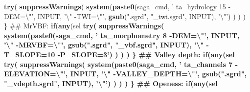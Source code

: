 \documentclass[11pt]{krantz}
\newenvironment{Shaded}{\begin{snugshade}}{\end{snugshade}}
\newcommand{\CharTok}[1]{\textcolor[rgb]{0.5,0.5,0.5}{#1}}
\newcommand{\ControlFlowTok}[1]{\textcolor[rgb]{0.27,0.27,0.27}{\textbf{#1}}}
\newcommand{\KeywordTok}[1]{\textcolor[rgb]{0.27,0.27,0.27}{\textbf{#1}}}
\newcommand{\NormalTok}[1]{#1}
\newcommand{\OperatorTok}[1]{\textcolor[rgb]{0.43,0.43,0.43}{\textbf{#1}}}
\newcommand{\StringTok}[1]{\textcolor[rgb]{0.5,0.5,0.5}{#1}}
\theoremstyle{definition}
\theoremstyle{definition}
\theoremstyle{definition}
\theoremstyle{remark}
\begin{document}
\begin{Shaded}
\begin{Highlighting}[]
{{    \KeywordTok{try}\NormalTok{( }\KeywordTok{suppressWarnings}\NormalTok{( }\KeywordTok{system}\NormalTok{(}\KeywordTok{paste0}\NormalTok{(saga_cmd, }
                                         \StringTok{' ta_hydrology 15 -DEM=}\CharTok{\textbackslash{}"}\StringTok{'}\NormalTok{, }
\NormalTok{                                         INPUT, }\StringTok{'}\CharTok{\textbackslash{}"}\StringTok{ -TWI=}\CharTok{\textbackslash{}"}\StringTok{'}\NormalTok{, }
                                         \KeywordTok{gsub}\NormalTok{(}\StringTok{".sgrd"}\NormalTok{, }\StringTok{"_twi.sgrd"}\NormalTok{, INPUT), }\StringTok{'}\CharTok{\textbackslash{}"}\StringTok{'}\NormalTok{) ) ) )}
\NormalTok{  \}}
\NormalTok{  ## MrVBF:}
  \ControlFlowTok{if}\NormalTok{(}\KeywordTok{any}\NormalTok{(sel }\OperatorTok{%
    \KeywordTok{try}\NormalTok{( }\KeywordTok{suppressWarnings}\NormalTok{( }\KeywordTok{system}\NormalTok{(}\KeywordTok{paste0}\NormalTok{(saga_cmd, }
                                         \StringTok{' ta_morphometry 8 -DEM=}\CharTok{\textbackslash{}"}\StringTok{'}\NormalTok{, }
\NormalTok{                                         INPUT, }\StringTok{'}\CharTok{\textbackslash{}"}\StringTok{ -MRVBF=}\CharTok{\textbackslash{}"}\StringTok{'}\NormalTok{,}
                                         \KeywordTok{gsub}\NormalTok{(}\StringTok{".sgrd"}\NormalTok{, }\StringTok{"_vbf.sgrd"}\NormalTok{, INPUT),}
                                         \StringTok{'}\CharTok{\textbackslash{}"}\StringTok{ -T_SLOPE=10 -P_SLOPE=3'}\NormalTok{) ) ) )}
\NormalTok{  \}}
\NormalTok{  ## Valley depth:}
  \ControlFlowTok{if}\NormalTok{(}\KeywordTok{any}\NormalTok{(sel }\OperatorTok{%
    \KeywordTok{try}\NormalTok{( }\KeywordTok{suppressWarnings}\NormalTok{( }\KeywordTok{system}\NormalTok{(}\KeywordTok{paste0}\NormalTok{(saga_cmd, }
                                         \StringTok{' ta_channels 7 -ELEVATION=}\CharTok{\textbackslash{}"}\StringTok{'}\NormalTok{, }
\NormalTok{                                         INPUT, }\StringTok{'}\CharTok{\textbackslash{}"}\StringTok{ -VALLEY_DEPTH=}\CharTok{\textbackslash{}"}\StringTok{'}\NormalTok{, }
                                         \KeywordTok{gsub}\NormalTok{(}\StringTok{".sgrd"}\NormalTok{, }\StringTok{"_vdepth.sgrd"}\NormalTok{, }
\NormalTok{                                              INPUT), }\StringTok{'}\CharTok{\textbackslash{}"}\StringTok{'}\NormalTok{) ) ) )}
\NormalTok{  \}}
\NormalTok{  ## Openess:}
  \ControlFlowTok{if}\NormalTok{(}\KeywordTok{any}\NormalTok{(sel }\OperatorTok{%
}}}}}
\end{Highlighting}
\end{Shaded}
\end{document}
